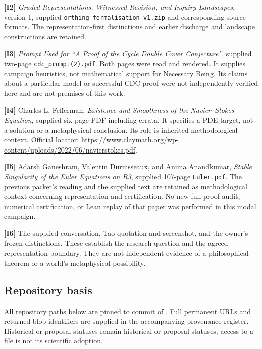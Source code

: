 \documentclass[11pt,a4paper]{article}
\begin{document}
\textbf{{[}I2{]}} \emph{Graded Representations, Witnessed Revision, and
Inquiry Landscapes}, version 1, supplied
\texttt{orthing\_formalisation\_v1.zip} and corresponding source
formats. The representation-first distinctions and earlier discharge and
landscape constructions are retained.

\textbf{{[}I3{]}} \emph{Prompt Used for ``A Proof of the Cycle Double
Cover Conjecture''}, supplied two-page \texttt{cdc\_prompt(2).pdf}. Both
pages were read and rendered. It supplies campaign heuristics, not
mathematical support for Necessary Being. Its claims about a particular
model or successful CDC proof were not independently verified here and
are not premises of this work.

\textbf{{[}I4{]}} Charles L. Fefferman, \emph{Existence and Smoothness
of the Navier--Stokes Equation}, supplied six-page PDF including errata.
It specifies a PDE target, not a solution or a metaphysical conclusion.
Its role is inherited methodological context. Official locator:
\url{https://www.claymath.org/wp-content/uploads/2022/06/navierstokes.pdf}.

\textbf{{[}I5{]}} Adarsh Ganeshram, Valentin Duruisseaux, and Anima
Anandkumar, \emph{Stable Singularity of the Euler Equations on R3},
supplied 107-page \texttt{Euler.pdf}. The previous packet's reading and
the supplied text are retained as methodological context concerning
representation and certification. No new full proof audit, numerical
certification, or Lean replay of that paper was performed in this modal
campaign.

\textbf{{[}I6{]}} The supplied conversation, Tao quotation and
screenshot, and the owner's frozen distinctions. These establish the
research question and the agreed representation boundary. They are not
independent evidence of a philosophical theorem or a world's
metaphysical possibility.

\subsection*{Repository basis}\label{repository-basis}

All repository paths below are pinned to commit
 of
. Full permanent URLs and returned blob
identifiers are supplied in the accompanying provenance register.
Historical or proposal statuses remain historical or proposal statuses;
access to a file is not its scientific adoption.
\end{document}
